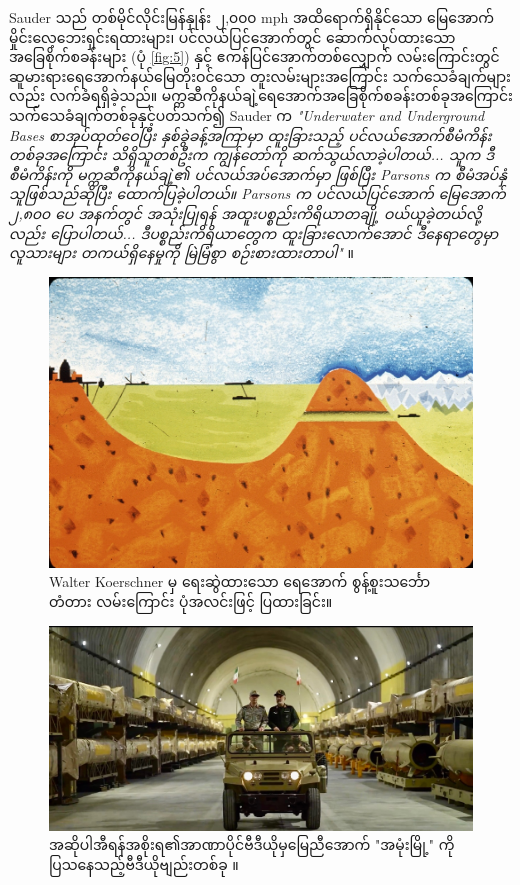 \documentclass[10pt,twocolumn,letterpaper]{article}
\begin{document}
Sauder သည် တစ်မိုင်လိုင်းမြန်နှုန်း ၂,၀၀၀ mph အထိရောက်ရှိနိုင်သော မြေအောက်မှိုင်းလေ့ဘေးရှင်းရထားများ၊ ပင်လယ်ပြင်အောက်တွင် ဆောက်လုပ်ထားသော အခြေစိုက်စခန်းများ (ပုံ \ref{fig:5}) နှင့် ဧကန်ပြင်အောက်တစ်လျှောက် လမ်းကြောင်းတွင် ဆူမားရားရေအောက်နယ်မြေတိုးဝင်သော တူးလမ်းများအကြောင်း သက်သေခံချက်များလည်း လက်ခံရရှိခဲ့သည်။ မက္ကဆီကိုနယ်ချဲ့ရေအောက်အခြေစိုက်စခန်းတစ်ခုအကြောင်း သက်သေခံချက်တစ်ခုနှင့်ပတ်သက်၍ Sauder က \textit{"Underwater and Underground Bases စာအုပ်ထုတ်ဝေပြီး နှစ်ခွဲခန့်အကြာမှာ ထူးခြားသည့် ပင်လယ်အောက်စီမံကိန်းတစ်ခုအကြောင်း သိရှိသူတစ်ဦးက ကျွန်တော်ကို ဆက်သွယ်လာခဲ့ပါတယ်... သူက ဒီစီမံကိန်းကို မက္ကဆီကိုနယ်ချဲ့၏ ပင်လယ်အပ်အောက်မှာ ဖြစ်ပြီး Parsons က စီမံအပ်နှံသူဖြစ်သည်ဆိုပြီး ထောက်ပြခဲ့ပါတယ်။ Parsons က ပင်လယ်ပြင်အောက် မြေအောက် ၂,၈၀၀ ပေ အနက်တွင် အသုံးပြုရန် အထူးပစ္စည်းကိရိယာတချို့ ဝယ်ယူခဲ့တယ်လို့လည်း ပြောပါတယ်... ဒီပစ္စည်းကိရိယာတွေက ထူးခြားလောက်အောင် ဒီနေရာတွေမှာ လူသားများ တကယ်ရှိနေမှုကို မြဲမြံစွာ စဉ်းစားထားတာပါ"} \cite{22}။
\begin{figure}[t]
\begin{center}
   \includegraphics[width=1\linewidth]{sub.jpg}
\end{center}
   \caption{Walter Koerschner \cite{22,23} မှ ရေးဆွဲထားသော ရေအောက် စွန့်စူးသင်္ဘော တံတား လမ်းကြောင်း ပုံအလင်းဖြင့် ပြထားခြင်း။}
\label{fig:6}
\label{fig:onecol}
\end{figure}
\begin{figure}[t]
\begin{center}
   \includegraphics[width=1\linewidth]{iran.jpeg}
\end{center}
   \caption{အဆိုပါအီရန်အစိုးရ၏အာဏာပိုင်ဗီဒီယိုမှမြေညီအောက် "အမုံးမြို့" ကိုပြသနေသည့်ဗီဒီယိုဗျည်းတစ်ခု \cite{39,40}။}
\label{fig:12}
\label{fig:onecol}
\end{figure}
\end{document}
